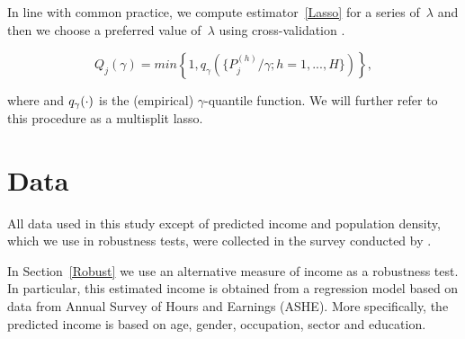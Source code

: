 \documentclass[a4paper,12pt]{article}
\begin{document}
In line with common practice, we compute estimator~\eqref{Lasso} for a series of~$\lambda$ and then we choose a preferred value of~$\lambda$ using cross-validation \citep{statisHighDimData}.



\begin{equation}\label{pvals}
Q_j(\gamma)=min \left \{1,q_{\gamma} (   \{ P^{(h)}_j/\gamma; h=1,...,H\}) \right \},
\end{equation}

 where and $q_{\gamma}(\tiny{\cdot})$ is the (empirical) $\gamma$-quantile function. We will further refer to this procedure as a multisplit lasso. 
 






\FloatBarrier
\section{Data}\label{Data}
All data used in this study except of predicted income and population density, which we use in robustness tests,  were collected in the survey conducted by \cite{SurveyUK}. 



In Section~\ref{Robust} we use an alternative measure of income as a robustness test. In particular, this estimated income is obtained from a regression model based on data from Annual Survey of Hours and Earnings (ASHE). More specifically, the predicted income is based on age, gender, occupation, sector and education.
\end{document}
